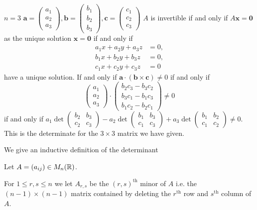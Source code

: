 \documentclass[10pt, a4paper]{article}
\newcommand{\mbf}[1]{\mathbf{#1}}
\begin{document}
$n = 3$
$\mbf{a} = \begin{pmatrix}
    a_1 \\ a_2 \\ a_3
\end{pmatrix}, \mbf{b} = \begin{pmatrix}
    b_1 \\ b_2 \\ b_3
\end{pmatrix}, \mbf{c} = \begin{pmatrix}
    c_1 \\ c_2 \\ c_3
\end{pmatrix}$
$A$ is invertible if and only if $A\mbf{x} = \mbf{0}$ as the unique solution $\mbf{x} = \mbf{0}$
if and only if
\begin{align*}
    a_1x + a_2y + a_3z &= 0, \\
    b_1x + b_2y + b_3z &= 0, \\
    c_1x + c_2y + c_3z &= 0
\end{align*}
have a unique solution.
If and only if $\mbf{a}\cdot (\mbf{b}\times \mbf{c}) \neq 0$
if and only if
\[
\begin{pmatrix}
    a_1 \\ a_2 \\ a_3
\end{pmatrix}
\cdot
\begin{pmatrix}
    b_2c_3 - b_3c_2 \\
    b_3c_1 - b_1c_3 \\
    b_1c_2 - b_2c_1
\end{pmatrix}
\neq 0
\]
if and only if
$a_1 \det\begin{pmatrix}
    b_2 & b_3 \\
    c_2 & c_3
\end{pmatrix} - a_2\det\begin{pmatrix}
    b_1 & b_3 \\ c_1 & c_3
\end{pmatrix} + a_3\det\begin{pmatrix}
    b_1 & b_2 \\ c_1 & c_2
\end{pmatrix} \neq 0$.
This is the determinate for the $3 \times 3$ matrix we have given.

We give an inductive definition of the determinant

Let $A = (a_{ij}) \in M_n(\mathbb{R})$.

For $1 \leq r, s \leq n$ we let
$A_{r, s}$ be the $(r, s)^{\text{th}}$ minor of $A$ i.e. the $(n - 1) \times (n - 1)$ matrix contained by deleting the $r^{\text{th}}$ row and $s ^ {\text{th}}$ column of $A$.
\end{document}
